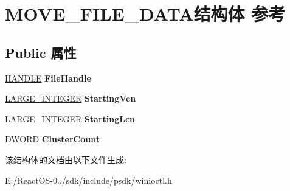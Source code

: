 \hypertarget{struct_m_o_v_e___f_i_l_e___d_a_t_a}{}\section{M\+O\+V\+E\+\_\+\+F\+I\+L\+E\+\_\+\+D\+A\+T\+A结构体 参考}
\label{struct_m_o_v_e___f_i_l_e___d_a_t_a}
\subsection*{Public 属性}
\begin{DoxyCompactItemize}
\item 
\mbox{\label{struct_m_o_v_e___f_i_l_e___d_a_t_a_a972952759721ef96666e0e6666e9706e}} 
\hyperlink{interfacevoid}{H\+A\+N\+D\+LE} {\bfseries File\+Handle}
\item 
\mbox{\label{struct_m_o_v_e___f_i_l_e___d_a_t_a_a6a82a0d98420b1f429051fe803e233cf}} 
\hyperlink{union___l_a_r_g_e___i_n_t_e_g_e_r}{L\+A\+R\+G\+E\+\_\+\+I\+N\+T\+E\+G\+ER} {\bfseries Starting\+Vcn}
\item 
\mbox{\label{struct_m_o_v_e___f_i_l_e___d_a_t_a_a3e7d21a8812d217d63df1ecdc0bc252d}} 
\hyperlink{union___l_a_r_g_e___i_n_t_e_g_e_r}{L\+A\+R\+G\+E\+\_\+\+I\+N\+T\+E\+G\+ER} {\bfseries Starting\+Lcn}
\item 
\mbox{\label{struct_m_o_v_e___f_i_l_e___d_a_t_a_aa75519d82b07a67b913e7338ef128f8f}} 
D\+W\+O\+RD {\bfseries Cluster\+Count}
\end{DoxyCompactItemize}


该结构体的文档由以下文件生成\+:\begin{DoxyCompactItemize}
\item 
E\+:/\+React\+O\+S-\/0../sdk/include/psdk/winioctl.\+h\end{DoxyCompactItemize}
